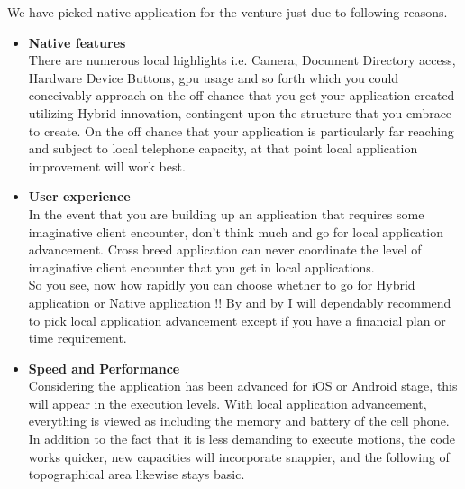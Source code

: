 We have picked native application for the venture just due to following reasons.

\begin{itemize}
  \item \textbf{Native features} \\ 
  There are numerous local highlights i.e. Camera, Document Directory access, Hardware Device Buttons, \gls{gpu} usage and so forth which you could conceivably approach on the off chance that you get your application created utilizing Hybrid innovation, contingent upon the structure that you embrace to create. On the off chance that your application is particularly far reaching and subject to local telephone capacity, at that point local application improvement will work best.
  
  \item \textbf{User experience} \\ 
  In the event that you are building up an application that requires some imaginative client encounter, don't think much and go for local application advancement. Cross breed application can never coordinate the level of imaginative client encounter that you get in local applications. \\
  So you see, now how rapidly you can choose whether to go for Hybrid application or Native application !! By and by I will dependably recommend to pick local application advancement except if you have a financial plan or time requirement.
  
  \item \textbf{Speed and Performance} \\
 Considering the application has been advanced for iOS or Android stage, this will appear in the execution levels. With local application advancement, everything is viewed as including the memory and battery of the cell phone. In addition to the fact that it is less demanding to execute motions, the code works quicker, new capacities will incorporate snappier, and the following of topographical area likewise stays basic.
 
\end{itemize}
